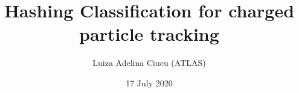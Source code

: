 \documentclass{beamer}
\title[Hashing classification for tracking ]{Hashing Classification for charged particle tracking}
\author[Luiza Adelina Ciucu (ATLAS) ]{Luiza Adelina Ciucu (ATLAS)}
\date{17 July 2020}
\begin{document}
\frame{\titlepage}


\newcommand\inputFolderMerge{../output_new_ev_000_100_min_10}
\newcommand\inputFolderMergedBalanced{../output_new_ev_000_100_min_10_balanced17}
\newcommand\inputFolderNN{../output_new_ev_000_100_min_10_NN_07}
\newcommand\inputFolderOverlay{../output_overlay_balanced_ev_000_100_Min10_17_B}


\def\volumeID{\texttt{\detokenize{volume_id}}}
\def\layerID{\texttt{\detokenize{layer_id}}}

\def\TP{\ifmmode {\mathrm{TP}}\else
                   \textrm{TP}\fi}%
\def\FP{\ifmmode {\mathrm{FP}}\else
                   \textrm{FP}\fi}%
\def\FN{\ifmmode {\mathrm{FN}}\else
                   \textrm{FN}\fi}%
\def\TN{\ifmmode {\mathrm{TN}}\else
                   \textrm{TN}\fi}%

\def\Ni{\ifmmode {\mathrm{N}_\mathrm{i}}\else
                   \textrm{N}_{\textrm{i}}\fi}%
\def\wi{\ifmmode {\mathrm{w}_\mathrm{i}}\else
                   \textrm{w}_{\textrm{i}}\fi}%
\def\xi{\ifmmode {\mathrm{x}_\mathrm{i}}\else
                   \textrm{x}_{\textrm{i}}\fi}%
\def\wzero{\ifmmode {\mathrm{w}_\mathrm{0}}\else
                   \textrm{w}_{\textrm{0}}\fi}%
\def\xzero{\ifmmode {\mathrm{x}_\mathrm{0}}\else
                   \textrm{x}_{\textrm{0}}\fi}%
                   
\end{document}
